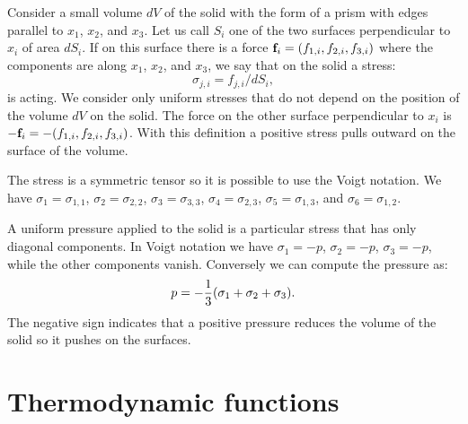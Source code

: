 \documentclass[12pt,a4paper,twoside]{report}
\begin{document}
Consider a small volume $dV$ of the solid with the form of a prism with 
edges parallel to $x_1$, $x_2$, and $x_3$. Let us call $S_i$ one of
the two surfaces perpendicular to $x_i$ of area $dS_i$. If on this surface 
there is a force ${\bf f}_i=(f_{1,i}, f_{2,i}, f_{3,i})$ where the components
are along $x_1$, $x_2$, and $x_3$, we say that on the solid a
stress: 
\begin{equation}
\sigma_{j,i}=f_{j,i} / dS_i, 
\end{equation}
is acting.
We consider only uniform stresses
that do not depend on the position of the volume $dV$ on the solid.
The force on the other surface perpendicular to $x_i$ is 
$-{\bf f}_i=-(f_{1,i}, f_{2,i}, f_{3,i})$. With this definition a positive
stress pulls outward on the surface of the volume.

The stress is a symmetric tensor so it is possible to use the Voigt
notation. We have
$\sigma_1=\sigma_{1,1}$,
$\sigma_2=\sigma_{2,2}$, $\sigma_3=\sigma_{3,3}$, $\sigma_4=\sigma_{2,3}$,
$\sigma_5=\sigma_{1,3}$, and $\sigma_6=\sigma_{1,2}$.

A uniform pressure applied to the solid is a particular stress that has
only diagonal components. In Voigt notation we have
$\sigma_1=-p$, $\sigma_2=-p$, $\sigma_3=-p$, while the other components
vanish. Conversely we can compute the pressure as:
\begin{equation}
p=-{1\over 3} (\sigma_1 + \sigma_2 + \sigma_3).
\end{equation}
The negative sign indicates that a positive pressure reduces the
volume of the solid so it pushes on the surfaces.

\newpage
{\color{dark-blue}\chapter{Thermodynamic functions}}
\color{black}
\end{document}
